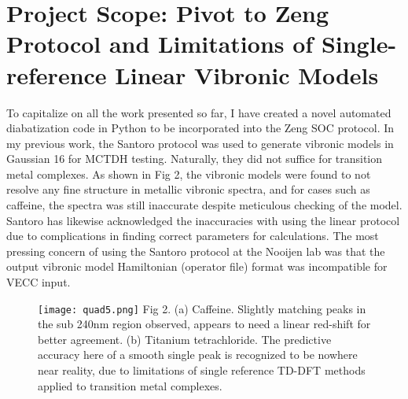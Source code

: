 

\section{Project Scope: Pivot to Zeng Protocol and Limitations of Single-reference Linear Vibronic Models}
To capitalize on all the work presented so far, I have created a novel automated diabatization code in Python to be incorporated into the Zeng SOC protocol. In my previous work, the Santoro protocol was used to generate vibronic models in Gaussian 16 for MCTDH testing. Naturally, they did not suffice for transition metal complexes. As shown in Fig 2, the vibronic models were found to not resolve any fine structure in metallic vibronic spectra, and for cases such as caffeine, the spectra was still inaccurate despite meticulous checking of the model. Santoro has likewise acknowledged the inaccuracies with using the linear protocol due to complications in finding correct parameters for calculations. The most pressing concern of using the Santoro protocol at the Nooijen lab was that the output vibronic model Hamiltonian (operator file) format was incompatible for VECC input.  

\begin{figure}[!ht]
    \center
    \texttt{[image: quad5.png]}
    \small Fig 2. (a) Caffeine. Slightly matching peaks in the sub 240nm region observed, appears to need a linear red-shift for better agreement. (b) Titanium tetrachloride. The predictive accuracy here of a smooth single peak is recognized to be nowhere near reality, due to limitations of single reference TD-DFT methods applied to transition metal complexes.
\end{figure}

